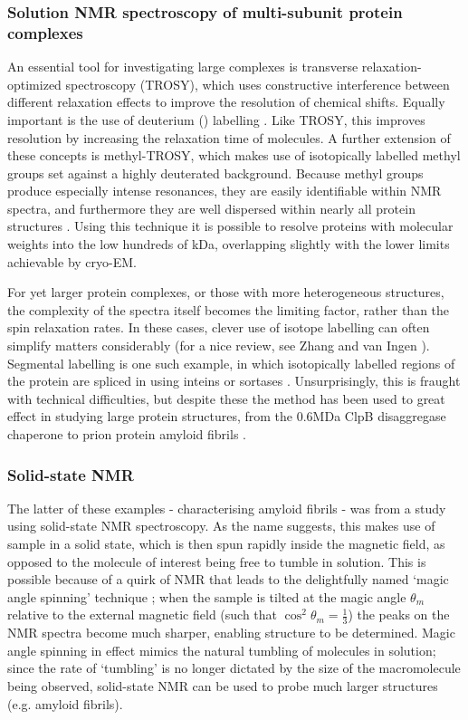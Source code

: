 \documentclass[a4paper,11pt,twoside,openright]{scrbook}
\begin{document}
\subsubsection{Solution NMR spectroscopy of multi-subunit protein complexes}
An essential tool for investigating large complexes is transverse relaxation-optimized spectroscopy \cite{Pervushin1997} (TROSY), which uses constructive interference between different relaxation effects to improve the resolution of chemical shifts. Equally important is the use of deuterium () labelling \cite{Sattler1996}. Like TROSY, this improves resolution by increasing the relaxation time of molecules. A further extension of these concepts is methyl-TROSY, which makes use of isotopically labelled  methyl groups set against a highly deuterated background. Because methyl groups produce especially intense resonances, they are easily identifiable within NMR spectra, and furthermore they are well dispersed within nearly all protein structures \cite{Ollerenshaw2003}. Using this technique it is possible to resolve proteins with molecular weights into the low hundreds of kDa, overlapping slightly with the lower limits achievable by cryo-EM.

For yet larger protein complexes, or those with more heterogeneous structures, the complexity of the spectra itself becomes the limiting factor, rather than the spin relaxation rates. In these cases, clever use of isotope labelling can often simplify matters considerably (for a nice review, see Zhang and van Ingen \cite{Zhang2016}). Segmental labelling is one such example, in which isotopically labelled regions of the protein are spliced in using inteins or sortases \cite{Liu2009a}. Unsurprisingly, this is fraught with technical difficulties, but despite these the method has been used to great effect in studying large protein structures, from the 0.6MDa ClpB disaggregase chaperone \cite{Rosenzweig2015} to prion protein amyloid fibrils \cite{Frederick2017}.

\subsubsection{Solid-state NMR}
The latter of these examples - characterising amyloid fibrils - was from a study using solid-state NMR spectroscopy. As the name suggests, this makes use of sample in a solid state, which is then spun rapidly inside the magnetic field, as opposed to the molecule of interest being free to tumble in solution. This is possible because of a quirk of NMR that leads to the delightfully named `magic angle spinning' technique \cite{Andrew1958,Lowe1959}; when the sample is tilted at the magic angle $\theta_{m}$ relative to the external magnetic field (such that $\cos^{2}\theta_{m} = \frac{1}{3}$) the peaks on the NMR spectra become much sharper, enabling structure to be determined. Magic angle spinning in effect mimics the natural tumbling of molecules in solution; since the rate of `tumbling' is no longer dictated by the size of the macromolecule being observed, solid-state NMR can be used to probe much larger structures (e.g. amyloid fibrils).
\end{document}
